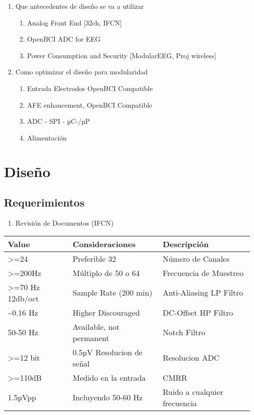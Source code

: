 \documentclass[11pt]{article}
\begin{document}
\begin{enumerate}
\item Que antecedentes de diseño se va a utilizar\\
\begin{enumerate}
\item Analog Front End [32ch, IFCN]\\
\item OpenBCI ADC for EEG\\
\item Power Consumption and Security [ModularEEG, Proj wireless]\\
\end{enumerate}

\item Como optimizar el diseño para modularidad\\
\begin{enumerate}
\item Entrada Electrodos OpenBCI Compatible\\
\item AFE enhancement, OpenBCI Compatible\\
\item ADC - SPI - µC-/µP\\
\item Alimentación\\
\end{enumerate}
\end{enumerate}



\section{Diseño}
\label{sec:orgee3bbe9}
\subsection{Requerimientos}
\label{sec:org586a432}
\begin{enumerate}
\item Revisión de Documentos (IFCN)\\
\end{enumerate}
\begin{center}
\begin{tabular}{lll}
Value & Consideraciones & Descripción\\
\hline
>=24 & Preferible 32 & Número de Canales\\
>=200Hz & Múltiplo de 50 o 64 & Frecuencia de Muestreo\\
>=70 Hz 12db/oct & Sample Rate (200 min) & Anti-Aliasing LP Filtro\\
\textasciitilde{}0.16 Hz & Higher Discouraged & DC-Offset HP Filtro\\
50-50 Hz & Available, not permanent & Notch Filtro\\
>=12 bit & 0.5µV Resolucion de señal & Resolucion ADC\\
>=110dB & Medido en la entrada & CMRR\\
1.5µVpp & Incluyendo 50-60 Hz & Ruido a cualquier frecuencia\\
\end{tabular}
\end{center}
\end{document}

